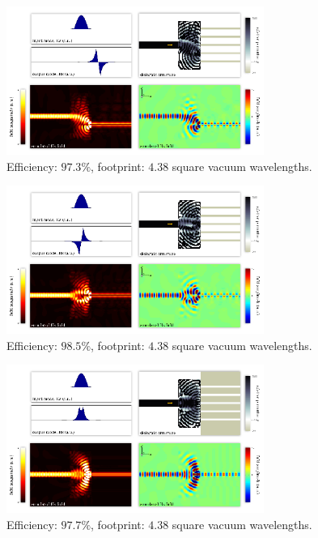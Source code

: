 \documentclass[letterpaper,10pt]{article}
\begin{document}
\begin{appendix}
\begin{figure}[htb]
    \centering
    \includegraphics[width=0.75\textwidth]{17}
    \caption{
        Efficiency: $97.3\%$,
        footprint: $4.38$ square vacuum wavelengths.
        }
\end{figure}


\begin{figure}[htb]
    \centering
    \includegraphics[width=0.75\textwidth]{18}
    \caption{
        Efficiency: $98.5\%$,
        footprint: $4.38$ square vacuum wavelengths.
        }
\end{figure}


\begin{figure}[htb]
    \centering
    \includegraphics[width=0.75\textwidth]{19}
    \caption{
        Efficiency: $97.7\%$,
        footprint: $4.38$ square vacuum wavelengths.
        }
\end{figure}



\end{appendix}
\end{document}
